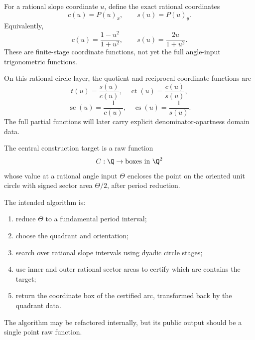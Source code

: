 \begin{definition}
\label{def:rational-circle-sin-cos}
For a rational slope coordinate \(u\), define the exact rational coordinates
\[
  c(u)=P(u)_x,\qquad s(u)=P(u)_y.
\]
Equivalently,
\[
  c(u)=\frac{1-u^2}{1+u^2},
  \qquad
  s(u)=\frac{2u}{1+u^2}.
\]
These are finite-stage coordinate functions, not yet the full angle-input
trigonometric functions.
\end{definition}

\begin{definition}
\label{def:rational-circle-other-trig}
On this rational circle layer, the quotient and reciprocal coordinate
functions are
\[
  t(u)=\frac{s(u)}{c(u)},\quad
  \operatorname{ct}(u)=\frac{c(u)}{s(u)},
\]
\[
  \operatorname{sc}(u)=\frac1{c(u)},\quad
  \operatorname{cs}(u)=\frac1{s(u)}.
\]
The full partial functions will later carry explicit denominator-apartness
domain data.
\end{definition}

\begin{definition}
\label{def:geometric-point-functionraw}
The central construction target is a raw function
\[
  C : \Q \to \hbox{boxes in }\Q^2
\]
whose value at a rational angle input \(\Theta\) encloses the point on the
oriented unit circle with signed sector area \(\Theta/2\), after period
reduction.

The intended algorithm is:
\begin{enumerate}
  \item reduce \(\Theta\) to a fundamental period interval;
  \item choose the quadrant and orientation;
  \item search over rational slope intervals using dyadic circle stages;
  \item use inner and outer rational sector areas to certify which arc
  contains the target;
  \item return the coordinate box of the certified arc, transformed back by
  the quadrant data.
\end{enumerate}
The algorithm may be refactored internally, but its public output should be a
single point raw function.
\end{definition}


